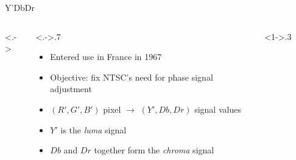 \documentclass[aspectratio=169,usepdftitle=false]{fireshonks}
\begin{document}
\begin{frame}{Y'DbDr}
    \begin{columns}<.->
        \begin{column}<.->{.7\textwidth}
            \begin{itemize}
                \item Entered use in France in 1967
                \item Objective: fix NTSC's need for phase signal adjustment
                \item $(R', G', B')$ pixel $\rightarrow$ $(Y', Db, Dr)$ signal values
                \item $Y'$ is the \emph{luma} signal
                \item $Db$ and $Dr$ together form the \emph{chroma} signal
            \end{itemize}
        \end{column}
        \begin{column}<1->{.3\textwidth}
            \begin{figure}

\end{figure}
\end{column}
\end{columns}
\end{frame}
\end{document}
